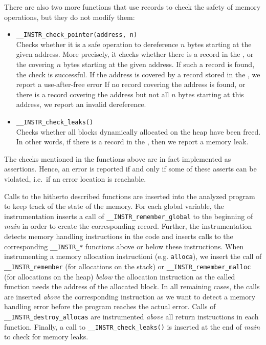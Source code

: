 There are also two more functions that use records to check
the safety of memory operations, but they do not modify them:
\begin{itemize}
\item \texttt{\_\_INSTR\_check\_pointer(address, n)}
  \\Checks whether it is a safe operation to dereference $n$ bytes
  starting at the given address. More precisely, it checks whether
  there is a record in the \stacklist, \heaplist or the \globalslist
  covering $n$ bytes starting at the given address.  If such a record
  is found, the check is successful. If the address is covered by a
  record stored in the \dealloclist, we report a use-after-free error
  If no record covering the address is found, or there is a record
  covering the address but not all $n$ bytes starting at this address,
  we report an invalid dereference.
\item \texttt{\_\_INSTR\_check\_leaks()}
  \\Checks whether all blocks dynamically allocated on the heap have been
  freed. In other words, if there is a record in the \heaplist, then we report
  a memory leak.
\end{itemize}

The checks mentioned in the functions above
are in fact implemented as assertions. Hence, an error is reported if
and only if some of these asserts can be violated, i.e.~if an error
location is reachable.

Calls to the hitherto described functions are inserted into the analyzed
program to keep track of the state of the memory.
For each global variable, the instrumentation inserts a call of
\texttt{\_\_INSTR\_remember\_global} to the beginning of \emph{main} in order
to create the corresponding record. Further, the instrumentation detects memory
handling instructions in the code and inserts calls to the corresponding
\texttt{\_\_INSTR\_*} functions above or below these instructions. When
instrumenting a memory allocation instructioni (e.g. \texttt{alloca}), we insert the call of
\texttt{\_\_INSTR\_remember} (for allocations on the stack) or
\texttt{\_\_INSTR\_remember\_malloc} (for allocations on the heap) \emph{below}
the allocation instruction as the called function needs the address of the
allocated block. In all remaining cases, the calls are inserted \emph{above} the
corresponding instruction as we want to detect a memory handling error before
the program reaches the actual error.
Calls of \texttt{\_\_INSTR\_destroy\_allocas} are instrumented \emph{above} all
return instructions in each function. Finally, a call to
\texttt{\_\_INSTR\_check\_leaks()} is inserted at the end of \emph{main} to
check for memory leaks.

